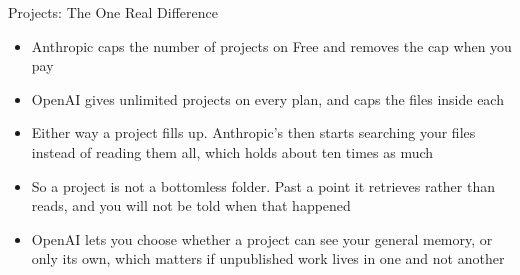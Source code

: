 \documentclass[aspectratio=169]{beamer}
\begin{document}
\begin{frame}{Projects: The One Real Difference}
    \begin{itemize}
        \item Anthropic caps the number of projects on Free and removes the cap when you pay
        \item OpenAI gives unlimited projects on every plan, and caps the files inside each
        \item Either way a project fills up. Anthropic's then starts searching your files
              instead of reading them all, which holds about ten times as much
        \item So a project is not a bottomless folder. Past a point it retrieves rather
              than reads, and you will not be told when that happened
        \item OpenAI lets you choose whether a project can see your general memory, or only
              its own, which matters if unpublished work lives in one and not another
    \end{itemize}
\end{frame}

\end{document}
